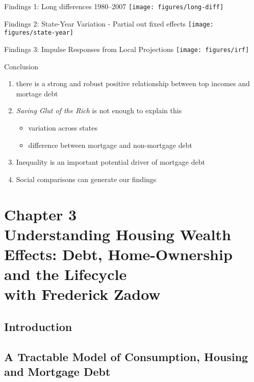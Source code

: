 \documentclass[aspectratio=169,mathserif,xcolor=dvipsnames]{beamer}
\begin{document}
 \begin{frame}{Findings 1: Long differences 1980--2007}
   \centering
   \texttt{[image: figures/long-diff]}
 \end{frame}

 \begin{frame}{Findings 2: State-Year Variation - Partial out fixed effects}
   \centering
   \texttt{[image: figures/state-year]}
 \end{frame}

 \begin{frame}{Findings 3: Impulse Responses from Local Projections}
   \centering
   \texttt{[image: figures/irf]}
 \end{frame}

 \begin{frame}{Conclusion}

   \begin{enumerate}
   \item there is a strong and robust positive relationship between top incomes and mortage debt
   \item \emph{Saving Glut of the Rich} is not enough to explain this
     \begin{itemize}
     \item variation across states
     \item difference between mortgage and non-mortgage debt
     \end{itemize}
     \pause
   \item Inequality is an important potential driver of mortgage debt
   \item Social comparisons can generate our findings
   \end{enumerate}
 \end{frame}
 
 \section{Chapter 3 \\ \large{Understanding Housing Wealth Effects: Debt, Home-Ownership and the Lifecycle \\ } \footnotesize{with Frederick Zadow}}


 \subsection{Introduction}
 
 \subsection{A Tractable Model of Consumption, Housing and Mortgage Debt}
 
\end{document}

